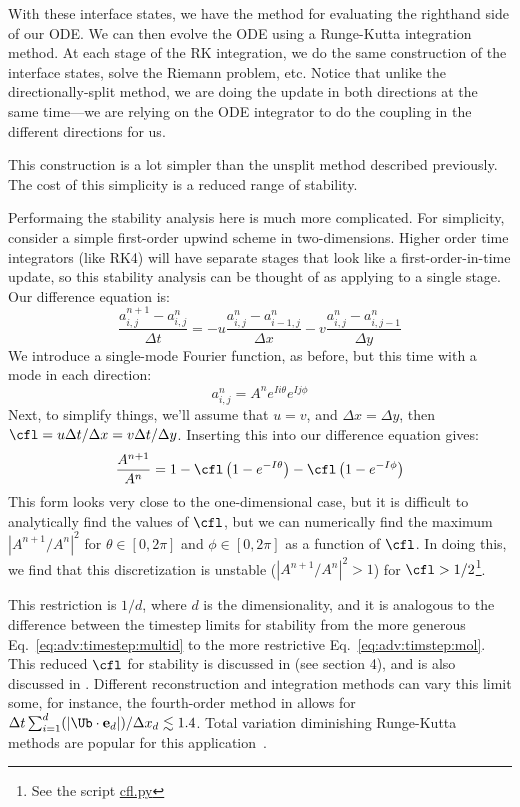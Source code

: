 With these interface states, we have the method for evaluating the
righthand side of our ODE.  We can then evolve the ODE using a
Runge-Kutta integration method.  At each stage of the RK integration,
we do the same construction of the interface states, solve the Riemann
problem, etc.  Notice that unlike the directionally-split method, we
are doing the update in both directions at the same time---we are
relying on the ODE integrator to do the coupling in the different
directions for us.

This construction is a lot simpler than the unsplit method described
previously.  The cost of this simplicity is a reduced range of
stability.

Performaing the stability analysis here is much more complicated.  For
simplicity, consider a simple first-order upwind scheme in
two-dimensions.  Higher order time integrators (like RK4) will have
separate stages that look like a first-order-in-time update, so this
stability analysis can be thought of as applying to a single stage.
Our difference equation is:
\begin{equation}
\frac{a^{n+1}_{i,j} - a^n_{i,j}}{\Delta t} = - u \frac{a^n_{i,j} - a^n_{i-1,j}}{\Delta x}
- v \frac{a^n_{i,j} - a^n_{i,j-1}}{\Delta y}
\end{equation}
We introduce a single-mode Fourier function, as before, but this time
with a mode in each direction:
\begin{equation}
a^n_{i,j} = A^n e^{Ii\theta}e^{Ij\phi}
\end{equation}
Next, to simplify things, we'll assume that $u = v$, and $\Delta x = \Delta y$,
then $\cfl = u \Delta t/ \Delta x = v \Delta t / \Delta y$.
Inserting this into our difference equation gives:
\begin{equation}
\frac{A^{n+1}}{A^n} = 1 - \cfl \left (1 - e^{-I\theta} \right ) - \cfl \left (1 - e^{-I\phi} \right )
\end{equation}
This form looks very close to the one-dimensional case, but it is
difficult to analytically find the values of $\cfl$, but we can
numerically find the maximum $ | {A^{n+1}}/{A^n} |^2$ for $\theta \in
[0, 2\pi]$ and $\phi \in [0, 2\pi]$ as a function of $\cfl$.  In doing
this, we find that this discretization is unstable ($| {A^{n+1}}/{A^n}
|^2 > 1$) for $\cfl > 1/2$\footnote{See the script
  \href{https://github.com/zingale/hydro_examples/blob/master/compressible/cfl.py}{cfl.py}}.

This restriction is $1/d$, where $d$ is the dimensionality, and it is
analogous to the difference between the timestep limits for stability
from the more generous Eq.~\ref{eq:adv:timestep:multid} to the more
restrictive Eq.~\ref{eq:adv:timstep:mol}.
This reduced $\cfl$ for stability is discussed in
\cite{shuosher:1989b} (see section 4), and is also discussed in
\cite{titarevtoro,mccorquodalecolella}.  Different reconstruction and
integration methods can vary this limit some, for instance, the fourth-order
method in \cite{mccorquodalecolella} allows for $\Delta t \sum_{i=1}^d (|\Ub \cdot \mathbf{e}_d|)/\Delta x_d  \lesssim 1.4$.  Total variation diminishing Runge-Kutta methods are popular
for this application~\cite{gottliebshu:1996}.

